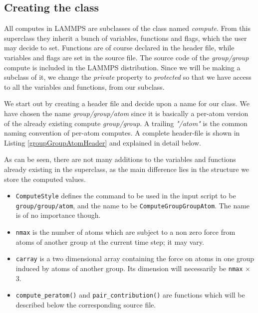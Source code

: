 \documentclass[twoside,english]{uiofysmaster}
\begin{document}
\subsection{Creating the class}
All computes in LAMMPS are subclasses of the class named  \textit{compute}. 
From this superclass they inherit a bunch of variables, functions and flags, which the user may decide to set. 
Functions are of course declared in the header file, while variables and flags are set in the source file. 
The source code of the \textit{group/group} compute is included in the LAMMPS distribution. 
Since we will be making a subclass of it, we change the \textit{private} property to \textit{protected} so that we have access to all the variables and functions, from our subclass.

We start out by creating a header file and decide upon a name for our class. 
We have chosen the name \textit{group/group/atom} since it is basically a per-atom version of the already existing compute \textit{group/group}. 
A trailing {\it "/atom"} is the common naming convention of per-atom computes. 
A complete header-file is shown in Listing \ref{groupGroupAtomHeader} and explained in detail below.


As can be seen, there are not many additions to the variables and functions already existing in the superclass, as the main difference lies in the structure we store the computed values.

\begin{itemize}
\item \texttt{ComputeStyle} defines the command to be used in the input script to be \linebreak[1] \texttt{group/group/atom}, and the name to be \texttt{ComputeGroupGroupAtom}. 
	The name is of no importance though. 
\item \texttt{nmax} is the number of atoms which are subject to a non zero force from atoms of another group at the current time step; it may vary.

\item \texttt{carray} is a two dimensional array containing the force on atoms in one group induced by atoms of another group. Its dimension will necessarily be \texttt{nmax} $\times$ 3.

\item \texttt{compute\_peratom()} and \texttt{pair\_contribution()} are functions which will be described below the corresponding source file. 
\end{itemize}
\end{document}

